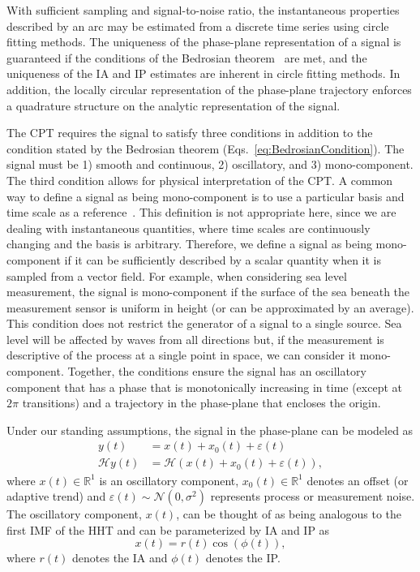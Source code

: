 \documentclass[a4paper]{IEEEtran}
\begin{document}
With sufficient sampling and signal-to-noise ratio, the instantaneous properties described by an arc may be estimated from a discrete time series using circle fitting methods. The uniqueness of the phase-plane representation of a signal is guaranteed if the conditions of the Bedrosian theorem~\cite{Bedrosian1963} are met, and the uniqueness of the IA and IP estimates are inherent in circle fitting methods. In addition, the locally circular representation of the phase-plane trajectory enforces a quadrature structure on the analytic representation of the signal.

The CPT requires the signal to satisfy three conditions in addition to the condition stated by the Bedrosian theorem (Eqs.~\ref{eq:BedrosianCondition}). The signal must be 1) smooth and continuous, 2) oscillatory, and 3) mono-component. The third condition allows for physical interpretation of the CPT. A common way to define a signal as being mono-component is to use a particular basis and time scale as a reference~\cite{Boashash1992,Cohen1995}. This definition is not appropriate here, since we are dealing with instantaneous quantities, where time scales are continuously changing and the basis is arbitrary. Therefore, we define a signal as being mono-component if it can be sufficiently described by a scalar quantity when it is sampled from a vector field. For example, when considering sea level measurement, the signal is mono-component if the surface of the sea beneath the measurement sensor is uniform in height (or can be approximated by an average). This condition does not restrict the generator of a signal to a single source. Sea level will be affected by waves from all directions but, if the measurement is descriptive of the process at a single point in space, we can consider it mono-component. Together, the conditions ensure the signal has an oscillatory component that has a phase that is monotonically increasing in time (except at $2\pi$ transitions) and a trajectory in the phase-plane that encloses the origin. 

Under our standing assumptions, the signal in the phase-plane can be modeled as
\begin{align}\label{eq:SignalModel}
y\left( t \right) &= x\left( t \right) + x_0\left( t \right) + \varepsilon \left( t \right) \\
\mathcal{H}y\left( t \right) &= \mathcal{H}(x\left( t \right) + x_0\left( t \right) + \varepsilon \left( t \right)),
\end{align}
where $x(t) \in \mathbb{R}^1$ is an oscillatory component, $x_0(t) \in \mathbb{R}^1$ denotes an offset (or adaptive trend) and $\varepsilon(t) \sim \mathcal{N}(0,\sigma^2)$ represents process or measurement noise. The oscillatory component, $x(t)$, can be thought of as being analogous to the first IMF of the HHT and can be parameterized by IA and IP as
\begin{equation}\label{eq:InstAmplitudeAndPhase}
    x\left( t \right) = r\left( t \right)\cos \left( {\phi \left( t \right)} \right),
\end{equation}
where $r(t)$ denotes the IA and $\phi(t)$ denotes the IP. 
\end{document}
